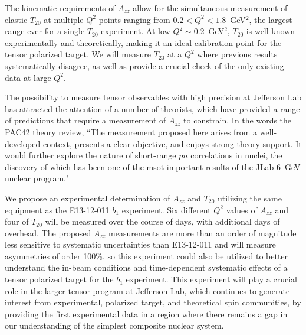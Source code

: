 The kinematic requirements of $A_{zz}$ allow for the simultaneous measurement of elastic $T_{20}$ at multiple $Q^2$ points ranging from $0.2<Q^2<1.8$~GeV$^2$, the largest range ever for a single $T_{20}$ experiment. At low $Q^2\sim0.2$~GeV$^2$, $T_{20}$ is well known experimentally and theoretically, making it an ideal calibration point for the tensor polarized target. We will measure $T_{20}$ at a $Q^2$ where previous results systematically disagree, as well as provide a crucial check of the only existing data at large $Q^2$.



The possibility to measure tensor observables with high precision at Jefferson Lab has attracted the attention of a number of theorists, which have provided a range of predictions that require a measurement of $A_{zz}$ to constrain. 
In the words the PAC42 theory review, ``The measurement proposed here arises from a well-developed context, presents a clear objective, and enjoys strong theory support. It would further explore the nature of short-range $pn$ correlations in nuclei, the discovery of which has been one of the msot important results of the JLab 6~GeV nuclear program." 

We propose an experimental determination of $A_{zz}$ and $T_{20}$ utilizing the same equipment as the E13-12-011 $b_1$ experiment.  Six different $Q^2$ values of $A_{zz}$ and four of $T_{20}$ will be measured over the course of \productiondays days, with \overheaddays additional days of overhead. The proposed $A_{zz}$ measurements are more than an order of magnitude less sensitive to systematic uncertainties than E13-12-011 and will measure asymmetries of order 100\%, so this experiment could also be utilized to better understand the in-beam conditions and time-dependent systematic effects of a tensor polarized target for the $b_1$ experiment. This experiment will play a crucial role in the larger tensor program at Jefferson Lab, which continues to generate interest from experimental, polarized target, and theoretical spin communities, by providing the first experimental data in a region where there remains a gap in our understanding of the simplest composite nuclear system.








